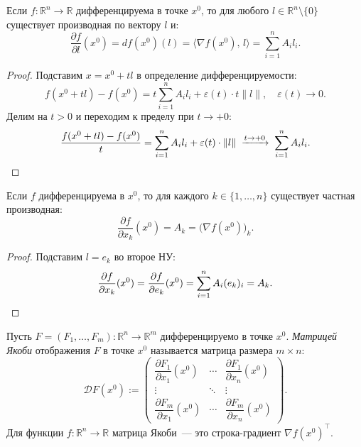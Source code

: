 \begin{theorem}
  Если $f : \mathbb{R}^n \to \mathbb{R}$ дифференцируема в точке $x^0$,
  то для любого $l \in \mathbb{R}^n \setminus \{0\}$ существует производная
  по вектору $l$ и:
  \[
    \frac{\partial f}{\partial l}(x^0)
    = df(x^0)(l)
    = \langle \nabla f(x^0),\, l \rangle
    = \sum_{i=1}^n A_i l_i.
  \]
  \begin{proof}
    Подставим $x = x^0 + tl$ в определение дифференцируемости:
    \[
      f(x^0 + tl) - f(x^0)
      = t \sum_{i=1}^n A_i l_i + \varepsilon(t)\cdot t\|l\|,
      \quad \varepsilon(t) \to 0.
    \]
    Делим на $t > 0$ и переходим к пределу при $t \to +0$:
    \[
      \frac{f(x^0 + tl) - f(x^0)}{t}
      = \sum_{i=1}^n A_i l_i + \varepsilon(t)\cdot\|l\|
      \;\xrightarrow{t \to +0}\;
      \sum_{i=1}^n A_i l_i. \qedhere
    \]
  \end{proof}
\end{theorem}

\begin{corollary}
  Если $f$ дифференцируема в $x^0$, то для каждого $k \in \{1,\ldots,n\}$
  существует частная производная:
  \[
    \frac{\partial f}{\partial x_k}(x^0) = A_k = \bigl(\nabla f(x^0)\bigr)_k.
  \]
  \begin{proof}
    Подставим $l = e_k$ во второе НУ:
    \[
      \frac{\partial f}{\partial x_k}(x^0)
      = \frac{\partial f}{\partial e_k}(x^0)
      = \sum_{i=1}^n A_i (e_k)_i = A_k. \qedhere
    \]
  \end{proof}
\end{corollary}

\begin{defn}
  Пусть $F = (F_1, \ldots, F_m) : \mathbb{R}^n \to \mathbb{R}^m$
  дифференцируемо в точке $x^0$.
  \textit{Матрицей Якоби} отображения $F$ в точке $x^0$ называется
  матрица размера $m \times n$:
  \[
    \mathcal{D}F(x^0)
    :=
    \begin{pmatrix}
      \dfrac{\partial F_1}{\partial x_1}(x^0) & \cdots &
      \dfrac{\partial F_1}{\partial x_n}(x^0) \\[8pt]
      \vdots & \ddots & \vdots \\[4pt]
      \dfrac{\partial F_m}{\partial x_1}(x^0) & \cdots &
      \dfrac{\partial F_m}{\partial x_n}(x^0)
    \end{pmatrix}.
  \]
  Для функции $f : \mathbb{R}^n \to \mathbb{R}$ матрица Якоби~---
  это строка-градиент $\nabla f(x^0)^\top$.
\end{defn}


